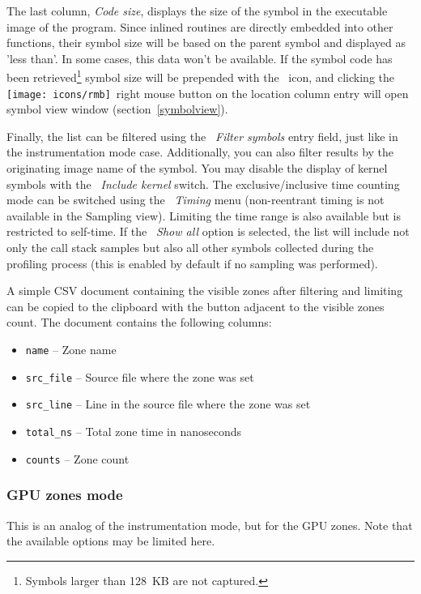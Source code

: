 \documentclass[hidelinks,titlepage,a4paper,twoside]{article}
\newcommand{\RMB}{\texttt{[image: icons/rmb]}}
\begin{document}
The last column, \emph{Code size}, displays the size of the symbol in the executable image of the program. Since inlined routines are directly embedded into other functions, their symbol size will be based on the parent symbol and displayed as 'less than'. In some cases, this data won't be available. If the symbol code has been retrieved\footnote{Symbols larger than 128~KB are not captured.} symbol size will be prepended with the \texttt{\faDatabase}~icon, and clicking the \RMB{}~right mouse button on the location column entry will open symbol view window (section~\ref{symbolview}).

Finally, the list can be filtered using the \emph{\faFilter{}~Filter symbols} entry field, just like in the instrumentation mode case. Additionally, you can also filter results by the originating image name of the symbol. You may disable the display of kernel symbols with the \emph{\faHatWizard{}~Include kernel} switch. The exclusive/inclusive time counting mode can be switched using the \emph{~Timing} menu (non-reentrant timing is not available in the Sampling view). Limiting the time range is also available but is restricted to self-time. If the \emph{\faPuzzlePiece{}~Show all} option is selected, the list will include not only the call stack samples but also all other symbols collected during the profiling process (this is enabled by default if no sampling was performed).

A simple CSV document containing the visible zones after filtering and limiting can be copied to the clipboard with the button adjacent to the visible zones count. The document contains the following columns:

\begin{itemize}
  \item \texttt{name} -- Zone name
  \item \texttt{src\_file} -- Source file where the zone was set
  \item \texttt{src\_line} -- Line in the source file where the zone was set
  \item \texttt{total\_ns} -- Total zone time in nanoseconds
  \item \texttt{counts} -- Zone count
\end{itemize}

\subsubsection{GPU zones mode}

This is an analog of the instrumentation mode, but for the GPU zones. Note that the available options may be limited here.
\end{document}
